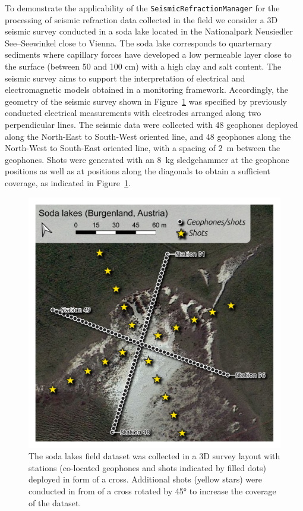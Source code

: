 \documentclass[a4paper,fleqn]{cas-sc}
\begin{document}
To demonstrate the applicability of the  \texttt{SeismicRefractionManager} for the processing of seismic refraction data collected in the field we consider a 3D seismic survey conducted in a soda lake located in the Nationalpark Neusiedler See--Seewinkel close to Vienna.
The soda lake corresponds to quarternary sediments where capillary forces have developed a low permeable layer close to the surface (between 50 and 100 cm) with a high clay and salt content.
The seismic survey aims to support the interpretation of electrical and electromagnetic models obtained in a monitoring framework.
Accordingly, the geometry of the seismic survey shown in Figure~\ref{fig:map_sodalakes} was specified by previously conducted electrical measurements with electrodes arranged along two perpendicular lines. The seismic data were collected with 48 geophones deployed along the North-East to South-West oriented line, and 48 geophones along the North-West to South-East oriented line, with a spacing of \qty{2}{m} between the geophones. Shots were generated with an \qty{8}{kg} sledgehammer at the geophone positions as well as at positions along the diagonals to obtain a sufficient coverage, as indicated in Figure~\ref{fig:map_sodalakes}.

\begin{figure}
	\centering
	\includegraphics[width=.75\textwidth]{./figures/map_sodalakes.pdf}
	\caption{The soda lakes field dataset was collected in a 3D survey layout with stations (co-located geophones and shots indicated by filled dots) deployed in form of a cross. Additional shots (yellow stars) were conducted in from of a cross rotated by 45° to increase the coverage of the dataset.}
	\label{fig:map_sodalakes}
\end{figure}
\end{document}
